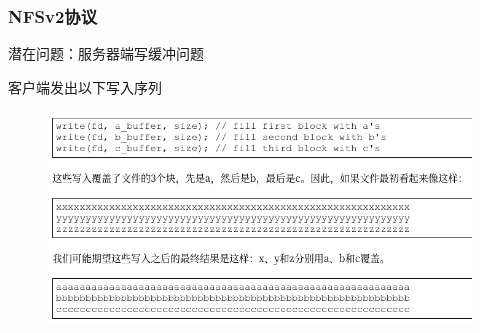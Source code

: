 \begin{frame}[fragile]
    \frametitle{NFSv2协议}
    潜在问题：服务器端写缓冲问题
    
    客户端发出以下写入序列
    
        \begin{figure}
            \includegraphics[width=.8\linewidth]{figs/nfsv2-srv1.png}
        \end{figure}
    
\end{frame}

